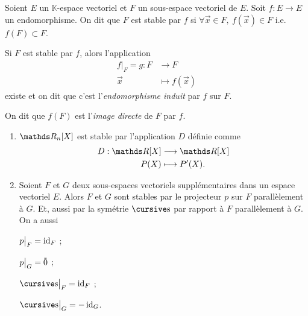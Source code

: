 \begin{defn}
	Soient $E$\/ un $\mathds{K}$-espace vectoriel et $F$\/ un sous-espace vectoriel de $E$. Soit $f : E \to E$\/ un endomorphisme. On dit que $F$\/ est stable par $f$\/ si $\forall \vec{x} \in F,\:f(\vec{x}) \in F$\/ i.e.\ $f(F) \subset F$.
\end{defn}

Si $F$\/ est stable par $f$, alors l'application \begin{align*}
	 f\big|_F = g: F &\longrightarrow F \\
	\vec{x} &\longmapsto f(\vec{x})
\end{align*}
existe et on dit que c'est l'{\it endomorphisme induit}\/ par $f$\/ sur $F$.

\begin{rap}
	On dit que $f(F)$\/ est l'{\it image directe}\/ de $F$\/ par $f$.
\end{rap}

\begin{exm}
	\begin{enumerate}
		\item $\R_n[X]$\/ est stable par l'application $D$\/ définie comme \begin{align*}
				D: \R[X] &\longrightarrow \R[X] \\
				P(X) &\longmapsto P'(X).
			\end{align*}
		\item Soient $F$\/ et $G$\/ deux sous-espaces vectoriels supplémentaires dans un espace vectoriel $E$. Alors $F$\/ et $G$\/ sont stables par le projecteur $p$\/ sur $F$\/ parallèlement à $G$. Et, aussi par la symétrie $\s$\/ par rapport à $F$\/ parallèlement à $G$. On a aussi
			\begin{multicols}{4}
					$\displaystyle p\big|_F = \operatorname{id}_F$\/ ;

					$\displaystyle p\big|_G = \tilde 0$\/ ;

					$\ds \s\big|_F = \id_F$\/ ;

					$\ds \s\big|_G = -\id_G$.
			\end{multicols}
	\end{enumerate}
\end{exm}

